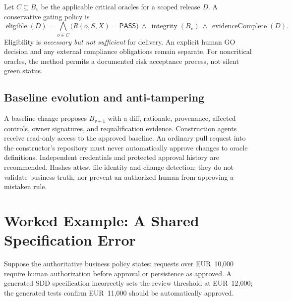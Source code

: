 \documentclass[11pt,a4paper]{article}
\newcommand{\PASS}{\textsf{PASS}}
\begin{document}
Let $C\subseteq B_v$ be the applicable critical oracles for a scoped release $D$. A conservative gating policy is
\begin{equation}
\operatorname{eligible}(D)=\bigwedge_{o\in C}
\big(R(o,S,X)=\PASS{}\big)\ \land\ \operatorname{integrity}(B_v)\ \land\ \operatorname{evidenceComplete}(D).
\end{equation}
Eligibility is \emph{necessary but not sufficient} for delivery. An explicit human \textsf{GO} decision and any external compliance obligations remain separate. For noncritical oracles, the method permits a documented risk acceptance process, not silent green status.

\subsection{Baseline evolution and anti-tampering}
A baseline change proposes $B_{v+1}$ with a diff, rationale, provenance, affected controls, owner signatures, and requalification evidence. Construction agents receive read-only access to the approved baseline. An ordinary pull request into the constructor's repository must never automatically approve changes to oracle definitions. Independent credentials and protected approval history are recommended. Hashes attest file identity and change detection; they do not validate business truth, nor prevent an authorized human from approving a mistaken rule.

\section{Worked Example: A Shared Specification Error}
Suppose the authoritative business policy states: requests over EUR~10,000 require human authorization before approval or persistence as approved. A generated SDD specification incorrectly sets the review threshold at EUR~12,000; the generated tests confirm EUR~11,000 should be automatically approved.
\end{document}
